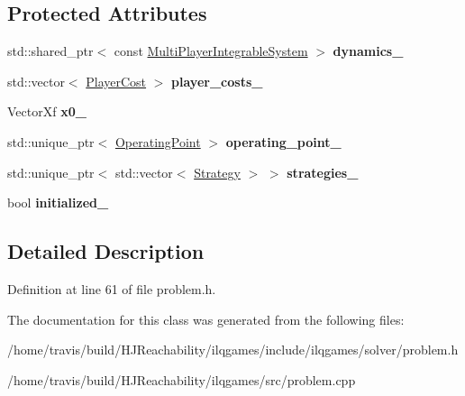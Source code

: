 \subsection*{Protected Attributes}
\begin{DoxyCompactItemize}
\item 
std\+::shared\+\_\+ptr$<$ const \hyperlink{classilqgames_1_1_multi_player_integrable_system}{Multi\+Player\+Integrable\+System} $>$ {\bfseries dynamics\+\_\+}\hypertarget{classilqgames_1_1_problem_a278a73f88a14262e31a56478301b6bde}{}\label{classilqgames_1_1_problem_a278a73f88a14262e31a56478301b6bde}

\item 
std\+::vector$<$ \hyperlink{classilqgames_1_1_player_cost}{Player\+Cost} $>$ {\bfseries player\+\_\+costs\+\_\+}\hypertarget{classilqgames_1_1_problem_a890d48d09b1713e9993514d2f0671b14}{}\label{classilqgames_1_1_problem_a890d48d09b1713e9993514d2f0671b14}

\item 
Vector\+Xf {\bfseries x0\+\_\+}\hypertarget{classilqgames_1_1_problem_a41236f0dfbc5eb6b1ddd08a5cc6555b3}{}\label{classilqgames_1_1_problem_a41236f0dfbc5eb6b1ddd08a5cc6555b3}

\item 
std\+::unique\+\_\+ptr$<$ \hyperlink{structilqgames_1_1_operating_point}{Operating\+Point} $>$ {\bfseries operating\+\_\+point\+\_\+}\hypertarget{classilqgames_1_1_problem_a2bb96299dbdc82440d6b90865ee9b2c1}{}\label{classilqgames_1_1_problem_a2bb96299dbdc82440d6b90865ee9b2c1}

\item 
std\+::unique\+\_\+ptr$<$ std\+::vector$<$ \hyperlink{structilqgames_1_1_strategy}{Strategy} $>$ $>$ {\bfseries strategies\+\_\+}\hypertarget{classilqgames_1_1_problem_a305d33a1e20a8ae63c0c581d562c7a64}{}\label{classilqgames_1_1_problem_a305d33a1e20a8ae63c0c581d562c7a64}

\item 
bool {\bfseries initialized\+\_\+}\hypertarget{classilqgames_1_1_problem_a0a6a0254a1c98f23e1041c2d73fca29f}{}\label{classilqgames_1_1_problem_a0a6a0254a1c98f23e1041c2d73fca29f}

\end{DoxyCompactItemize}


\subsection{Detailed Description}


Definition at line 61 of file problem.\+h.



The documentation for this class was generated from the following files\+:\begin{DoxyCompactItemize}
\item 
/home/travis/build/\+H\+J\+Reachability/ilqgames/include/ilqgames/solver/problem.\+h\item 
/home/travis/build/\+H\+J\+Reachability/ilqgames/src/problem.\+cpp\end{DoxyCompactItemize}
